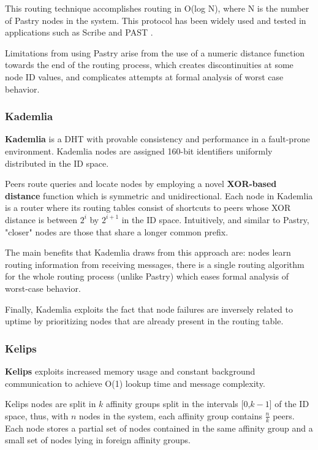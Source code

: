 This routing technique accomplishes routing in O(log N), where N is the number of Pastry nodes in the system. This protocol has been widely used and tested in applications such as Scribe \cite{10.1007/3-540-45546-9_3} and PAST \cite{990064}. 

Limitations from using Pastry arise from the use of a numeric distance function towards the end of the routing process, which creates discontinuities at some node ID values, and complicates attempts at formal analysis of worst case behavior.

\subsubsection{Kademlia}

\textbf{Kademlia} \cite{maymounkov2002kademlia} is a DHT with provable consistency and performance in a fault-prone environment. Kademlia nodes are assigned 160-bit identifiers uniformly distributed in the ID space.

Peers route queries and locate nodes by employing a novel \textbf{XOR-based distance} function which is symmetric and unidirectional. Each node in Kademlia is a router where its routing tables consist of shortcuts to peers whose XOR distance is between \(2^{i}\) by \(2^{i + 1}\) in the ID space. Intuitively, and similar to Pastry, "closer" nodes are those that share a longer common prefix.

The main benefits that Kademlia draws from this approach are: nodes learn routing information from receiving messages, there is a single routing algorithm for the whole routing process (unlike Pastry) which eases formal analysis of worst-case behavior. 

Finally, Kademlia exploits the fact that node failures are inversely related to uptime by prioritizing nodes that are already present in the routing table.

\subsubsection{Kelips}

\textbf{Kelips} \cite{gupta2003kelips} exploits increased memory usage and constant background communication to achieve O(1) lookup time and message complexity. 

Kelips nodes are split in $k$ affinity groups split in the intervals [0,$k-1$] of the ID space, thus, with $n$ nodes in the system, each affinity group contains $\frac{n}{k}$ peers.  Each node stores a partial set of nodes contained in the same affinity group and a small set of nodes lying in foreign affinity groups.

